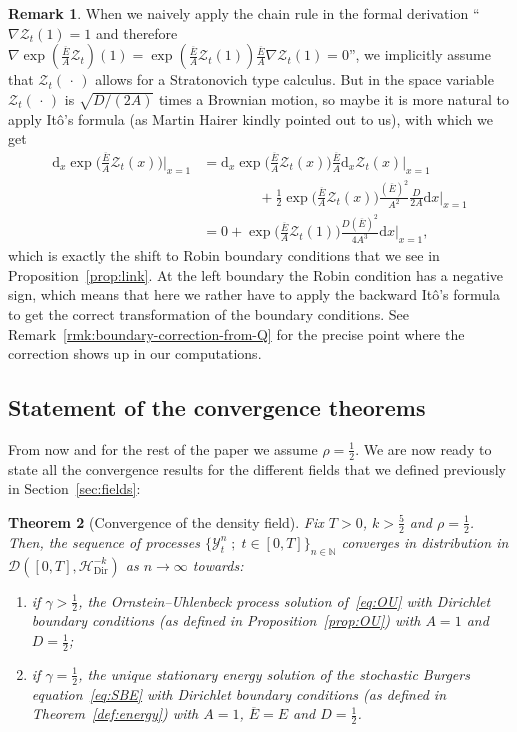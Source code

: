 \documentclass[10pt]{amsart}
\newtheorem{theo}{Theorem}[section]
\theoremstyle{definition}\newtheorem{defi}[theo]{Definition}\newtheorem{rema}[theo]{Remark}\newtheorem{exam}[theo]{Example}\newtheorem{exem}[theo]{Example}\newtheorem{nota}[theo]{Notation}
\newcommand{\bb}[1]{{\mathbb #1}}
\newcommand{\mc}[1]{{\mathcal #1}}
\renewcommand{\mc}[1]{{\mathcal #1}}
\renewcommand{\bar}{\overline}
\newcommand*{\dd}{\mathrm{d}}
\newcommand*{\dx}{\dd x}
\renewcommand{\tfrac}{\frac}
\begin{document}
\begin{rema}\label{rmk:ito-boundary}
When we naively apply the chain rule in the formal derivation ``$\nabla \mc Z_t (1) = 1$ and therefore $\nabla \exp(\tfrac{\bar{E}}{A} \mc Z_t)(1) = \exp(\tfrac{\bar{E}}{A} \mc Z_t(1)) \tfrac{\bar{E}}{A} \nabla \mc Z_t(1) = 0$'', we implicitly assume that $\mc Z_t({\,\cdot\,})$ allows for a Stratonovich type calculus. But in the space variable $\mc Z_t({\,\cdot\,})$ is $\sqrt{D/(2A)}$ times a Brownian motion, so maybe it is more natural to apply It\^o's formula (as Martin Hairer kindly pointed out to us), with which we get
\begin{align*}
\dd_x \exp\bigg(\tfrac{\bar{E}}{A} \mc Z_t(x)\bigg)\bigg|_{x=1} & = \dd_x \exp\bigg(\tfrac{\bar{E}}{A} \mc Z_t(x)\bigg)\frac{\bar{E}}{A} \dd_x \mc Z_t(x)\bigg|_{x=1} \\
&\qquad\qquad + \tfrac{1}{2} \exp\bigg(\tfrac{\bar{E}}{A} \mc Z_t(x)\bigg)\frac{(\bar{E})^2}{A^2} \frac{D}{2A} \dx\bigg|_{x=1}\\
& = 0 + \exp\bigg(\tfrac{\bar{E}}{A} \mc Z_t(1)\bigg)\frac{D(\bar{E})^2}{4A^3}\dx\bigg|_{x=1},
\end{align*}
which is exactly the shift to Robin boundary conditions that we see in Proposition~\ref{prop:link}. At the left boundary the Robin condition has a negative sign, which means that here we rather have to apply the backward It\^o's formula to get the correct transformation of the boundary conditions. See Remark~\ref{rmk:boundary-correction-from-Q} for the precise point where the correction shows up in our computations.
\end{rema}

\subsection{Statement of the convergence theorems} \label{ssec:results}
From now and for the rest of the paper we assume $\rho=\frac12$. We are now ready to state all the convergence results for the different fields that we defined previously in Section~\ref{sec:fields}:

\begin{theo}[Convergence of the density field]\label{theo:convergence}
Fix $T>0$, $k>\frac52$ and $\rho=\frac12$. Then, the sequence of processes $\{\mathcal{Y}_t^n \; ; \; t\in[0,T]\}_{n\in\bb N}$ converges in distribution in $\mc D([0,T],\mc H_{\mathrm{Dir}}^{-k})$ as $n\to \infty$ towards:
\begin{enumerate}
\item \label{3.17.1} if $\gamma>\frac12$, the Ornstein--Uhlenbeck process solution of~\eqref{eq:OU} with Dirichlet boundary conditions (as defined in Proposition~\ref{prop:OU}) with $A=1$ and $D=\frac12$;
\item \label{3.17.2} if $\gamma=\frac12$, the unique stationary energy solution of the stochastic Burgers equation~\eqref{eq:SBE} with Dirichlet boundary conditions (as defined in Theorem~\ref{def:energy}) with $A=1$, $\bar E=E$ and $D=\frac12$.
\end{enumerate}
\end{theo}
\end{document}
